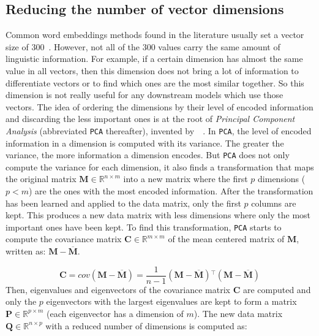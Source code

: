   \subsection{Reducing the number of vector dimensions}
    \label{ch04:subsec:reduce-dimensions}
    Common word embeddings methods found in the literature usually set a vector
    size of 300~\citep{mikolov2013distributed, pennington2014glove,
    bojanowski2016enriching}. However, not all of the 300 values carry the same
    amount of linguistic information. For example, if a certain dimension has
    almost the same value in all vectors, then this dimension does not bring a
    lot of information to differentiate vectors or to find which ones are the
    most similar together. So this dimension is not really useful for any
    downstream models which use those vectors. The idea of ordering the
    dimensions by their level of encoded information and discarding the less
    important ones is at the root of \textit{Principal Component Analysis}
    (abbreviated \texttt{PCA} thereafter), invented
    by~\citeauthor{pearson1901pca}~\citep{pearson1901pca}. In \texttt{PCA}, the
    level of encoded information in a dimension is computed with its variance.
    The greater the variance, the more information a dimension encodes. But
    \texttt{PCA} does not only compute the variance for each dimension, it also
    finds a transformation that maps the original matrix $\mathbf{M} \in
    \mathbb{R}^{n \times m}$ into a new matrix where the first $p$ dimensions
    ($p < m$) are the ones with the most encoded information. After the
    transformation has been learned and applied to the data matrix, only the
    first $p$ columns are kept. This produces a new data matrix with less
    dimensions where only the most important ones have been kept. To find this
    transformation, \texttt{PCA} starts to compute the covariance matrix
    $\mathbf{C} \in \mathbb{R}^{m \times m}$ of the mean centered matrix of
    $\mathbf{M}$, written as: $\mathbf{M} - \overline{\mathbf{M}}$.

    \begin{equation}
      \mathbf{C} = cov(\mathbf{M} - \overline{\mathbf{M}})
                 = \frac{1}{n - 1} (\mathbf{M} - \overline{\mathbf{M}}){}^\top
                                   (\mathbf{M} - \overline{\mathbf{M}})
    \end{equation}
    Then, eigenvalues and eigenvectors of the covariance matrix $\mathbf{C}$ are
    computed and only the $p$ eigenvectors with the largest eigenvalues are kept
    to form a matrix $\mathbf{P} \in \mathbb{R}^{p \times m}$ (each eigenvector
    has a dimension of $m$). The new data matrix $\mathbf{Q} \in \mathbb{R}^{n
    \times p}$ with a reduced number of dimensions is computed as:

